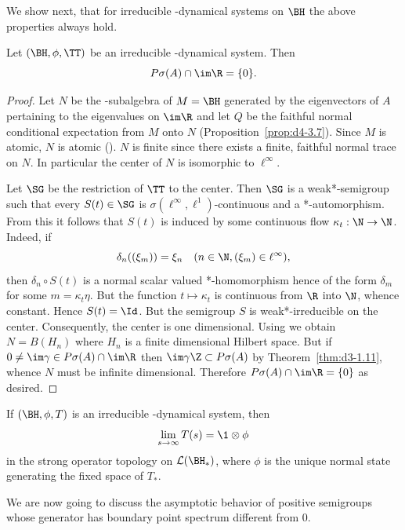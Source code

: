 We show next, that for irreducible \WA-dynamical systems on $ \BH $  the above properties always hold.
\begin{theorem}\label{thm:d4-3.8}
Let $ (\BH,\phi,\TT) $  be an irreducible \WA-dynamical system.
Then
\[
P\sigma(A) \cap \im\R = \{0\} .
\]

\end{theorem}
\begin{proof}
Let $ N $  be the \WA-subalgebra of\/ $ M = \BH $  generated by the eigenvectors of\/ $ A $  pertaining to the eigenvalues on $ \im\R $  and let $ Q $  be the faithful normal conditional expectation from $ M $  onto $ N $  (Proposition~\ref{prop:d4-3.7}).
Since $ M $  is atomic, $ N $  is atomic (\textcite{stormer:1972}).
$ N $  is finite since there exists a finite, faithful normal trace on $ N $.
In particular the center of\/ $ N $  is isomorphic to $ \ell^{\infty} $.

Let $ \SG $  be the restriction of\/ $ \TT $  to the center.
Then $ \SG $  is a weak*-semigroup such that every $ S(t) \in \SG $  is $ \sigma(\ell^{\infty},\ell^{1}) $-continuous and a *-automorphism.
From this it follows that $ S(t) $  is induced by some continuous flow $ \kappa_{t}: \N \to \N $.
Indeed, if\/ 
\[ 
\delta_{n}((\xi_{m})) = \xi_{n} \quad (n \in \N, (\xi_{m}) \in \ell^{\infty}),
\]
then $ \delta_{n} \circ S(t) $  is a normal scalar valued *-homomorphism hence of the form $ \delta_{m} $  for some $ m = \kappa_{t}\eta $.
But the function $ t \mapsto \kappa_{t} $  is continuous from $ \R $  into $ \N $, whence constant.
Hence $ S(t) = \Id $.
But the semigroup $ S $  is weak*-irreducible on the center.
Consequently, the center is one dimensional.
Using \textcite[Theorem V.1.27]{takesaki:1979} we obtain $ N = B(H_{n}) $  where $ H_{n} $  is a finite dimensional Hilbert space.
But if\/ $ 0 \neq \im\gamma \in P\sigma(A) \cap \im\R $  then $ \im\gamma\Z \subset P\sigma(A) $  by Theorem~\ref{thm:d3-1.11}, whence $ N $  must be infinite dimensional.
Therefore $ P\sigma(A) \cap \im\R = \{0\} $  as desired.
\end{proof}
\begin{corollary}\label{cor:d4-3.9}
If\/ $ (\BH,\phi,T) $  is an irreducible \WA-dynamical system, then
\[
	\lim_{s \to \infty} T(s) = \1 \otimes \phi
\]
in the strong operator topology on $ \mathcal{L}(\BH_{*}) $, where $ \phi $  is the unique normal state generating the fixed space of\/ $ T_{*} $.
\end{corollary}
We are now going to discuss the asymptotic behavior of positive semigroups whose generator has boundary point spectrum different from $ 0 $.
